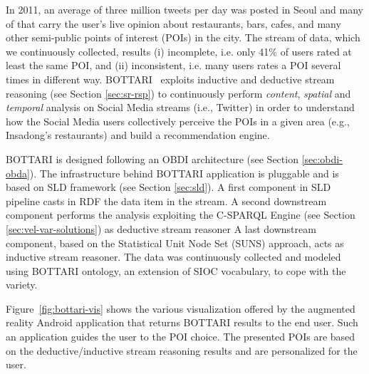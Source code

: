 In 2011, an average of three million tweets per day was posted in Seoul and many of that carry the user's live opinion about restaurants, bars, cafes, and many other semi-public points of interest (POIs) in the city. 
The stream of data, which we continuously collected, results (i) incomplete, i.e. only 41\% of users rated at least the same POI, and (ii) inconsistent, i.e. many users rates a POI several times in different way.
BOTTARI~\cite{DBLP:journals/ws/BalduiniCDVHLKT12} exploits inductive and deductive stream reasoning (see Section \ref{sec:sr-rsp}) to continuously perform \textit{content}, \textit{spatial} and \textit{temporal} analysis on Social Media streams (i.e., Twitter) in order to understand how the Social Media users collectively perceive the POIs in a given area (e.g., Insadong's restaurants) and build a recommendation engine.

BOTTARI is designed following an OBDI architecture (see Section \ref{sec:obdi-obda}). 
The infrastructure behind BOTTARI application is pluggable and is based on SLD framework (see Section \ref{sec:sld}). 
A first component in SLD pipeline casts in RDF the data item in the stream. 
A second downstream component performs the analysis exploiting the C-SPARQL Engine (see Section \ref{sec:vel-var-solutions}) as deductive stream reasoner
A last downstream component, based on the Statistical Unit Node Set (SUNS) \cite{tresp2009materializing,huang2010multivariate} approach, acts as inductive stream reasoner.
The data was continuously collected and modeled using BOTTARI ontology, an extension of SIOC vocabulary, to cope with the variety.

Figure~\ref{fig:bottari-vis} shows the various visualization offered by the augmented reality Android application that returns BOTTARI results to the end user. Such an application guides the user to the POI choice. The presented POIs are based on the deductive/inductive stream reasoning results and are personalized for the user.